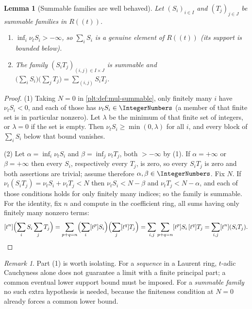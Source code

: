 \documentclass[11pt,oneside]{article}
\theoremstyle{plain}
\newtheorem{lemma}[theorem]{Lemma}
\theoremstyle{definition}
\theoremstyle{remark}
\newtheorem{remark}[theorem]{Remark}
\newcommand{\ordt}{\nu_{t}}                              %
\begin{document}
\begin{lemma}[Summable families are well behaved]
\label{plt:lem:mul-summable}
Let $(S_i)_{i\in I}$ and $(T_j)_{j\in J}$ be summable families in $R((t))$.
\begin{enumerate}
\item $\inf_i\ordt S_i>-\infty$, so $\sum_iS_i$ is a genuine element of
$R((t))$ (its support is bounded below).
\item The family $(S_iT_j)_{(i,j)\in I\times J}$ is summable and
$\bigl(\sum_iS_i\bigr)\bigl(\sum_jT_j\bigr)=\sum_{(i,j)}S_iT_j$.
\end{enumerate}
\end{lemma}

\begin{proof}
(1) Taking $N=0$ in \cref{plt:def:mul-summable}, only finitely many $i$ have
$\ordt S_i<0$, and each of those has $\ordt S_i\in\IntegerNumbers$ (a member
of that finite set is in particular nonzero).  Let $\lambda$ be the minimum of
that finite set of integers, or $\lambda=0$ if the set is empty.  Then
$\ordt S_i\ge\min(0,\lambda)$ for all $i$, and every block of
$\sum_iS_i$ below that bound vanishes.

(2) Let $\alpha=\inf_i\ordt S_i$ and $\beta=\inf_j\ordt T_j$, both
$>-\infty$ by (1).  If $\alpha=+\infty$ or $\beta=+\infty$ then every $S_i$,
respectively every $T_j$, is zero, so every $S_iT_j$ is zero and both
assertions are trivial; assume therefore $\alpha,\beta\in\IntegerNumbers$.
Fix $N$.  If $\ordt(S_iT_j)=\ordt S_i+\ordt T_j<N$ then
$\ordt S_i<N-\beta$ and $\ordt T_j<N-\alpha$, and each of those conditions
holds for only finitely many indices; so the family is summable.  For the
identity, fix $n$ and compute in the coefficient ring, all sums having only
finitely many nonzero terms:
\[
 [t^n]\Bigl(\sum_iS_i\sum_jT_j\Bigr)
 =\sum_{p+q=n}\Bigl(\sum_i[t^p]S_i\Bigr)\Bigl(\sum_j[t^q]T_j\Bigr)
 =\sum_{i,j}\sum_{p+q=n}[t^p]S_i\,[t^q]T_j
 =\sum_{i,j}[t^n](S_iT_j).
\]
\end{proof}

\begin{remark}
\label{plt:rmk:mul-summable-vs-cauchy}
Part (1) is worth isolating.  For a \emph{sequence} in a Laurent ring,
$t$-adic Cauchyness alone does not guarantee a limit with a finite principal
part; a common eventual lower support bound must be imposed.  For a
\emph{summable family} no such extra hypothesis is needed, because the
finiteness condition at $N=0$ already forces a common lower bound.
\end{remark}
\end{document}
